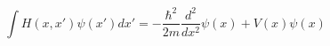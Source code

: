 \documentclass[12pt]{article}
\begin{document}
\begin{displaymath}
\int H(x,x')\psi(x')dx' = -\frac{\hbar^2}{2m}\frac{d^2}{dx^2}
                          \psi(x)+V(x)\psi(x)
\end{displaymath}
\end{document}

